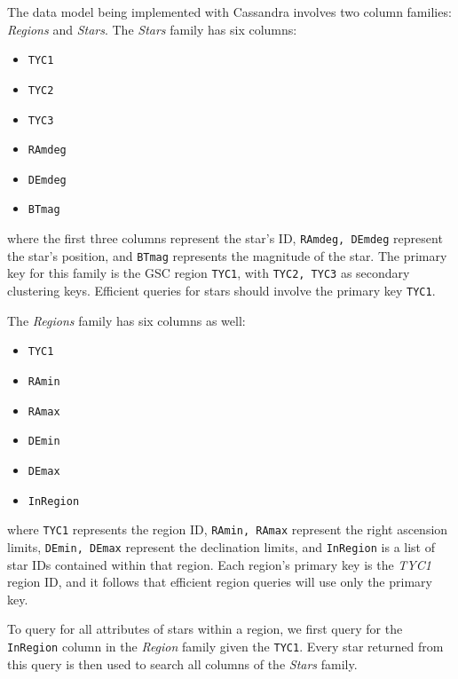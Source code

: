 The data model being implemented with Cassandra involves two column families: \textit{Regions} and \textit{Stars}.
The \textit{Stars} family has six columns:
\begin{multicols}{3}
    \begin{itemize}
        \item[] \texttt{TYC1}
        \item[] \texttt{TYC2}
        \item[] \texttt{TYC3}
        \item[] \texttt{RAmdeg}
        \item[] \texttt{DEmdeg}
        \item[] \texttt{BTmag}
    \end{itemize}
\end{multicols}
where the first three columns represent the star's ID, \texttt{RAmdeg, DEmdeg} represent the star's position, and
\texttt{BTmag} represents the magnitude of the star.
The primary key for this family is the GSC region \texttt{TYC1}, with \texttt{TYC2, TYC3} as secondary clustering
keys.
Efficient queries for stars should involve the primary key \texttt{TYC1}.

The \textit{Regions} family has six columns as well:
\begin{multicols}{3}
    \begin{itemize}
        \item[] \texttt{TYC1}
        \item[] \texttt{RAmin}
        \item[] \texttt{RAmax}
        \item[] \texttt{DEmin}
        \item[] \texttt{DEmax}
        \item[] \texttt{InRegion}
    \end{itemize}
\end{multicols}
where \texttt{TYC1} represents the region ID, \texttt{RAmin, RAmax} represent the right ascension limits,
\texttt{DEmin, DEmax} represent the declination limits, and \texttt{InRegion} is a list of star IDs contained within
that region.
Each region's primary key is the \textit{TYC1} region ID, and it follows that efficient region queries will use only
the primary key.

To query for all attributes of stars within a region, we first query for the \texttt{InRegion} column in the
\textit{Region} family given the \texttt{TYC1}.
Every star returned from this query is then used to search all columns of the \textit{Stars} family.

